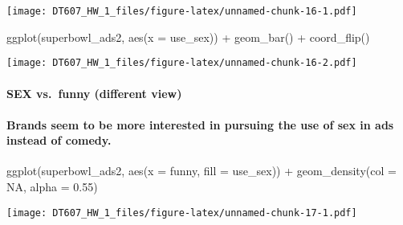 \documentclass[
]{article}
\newenvironment{Shaded}{\begin{snugshade}}{\end{snugshade}}
\newcommand{\AttributeTok}[1]{\textcolor[rgb]{0.77,0.63,0.00}{#1}}
\newcommand{\ConstantTok}[1]{\textcolor[rgb]{0.00,0.00,0.00}{#1}}
\newcommand{\FloatTok}[1]{\textcolor[rgb]{0.00,0.00,0.81}{#1}}
\newcommand{\FunctionTok}[1]{\textcolor[rgb]{0.00,0.00,0.00}{#1}}
\newcommand{\NormalTok}[1]{#1}
\newcommand{\SpecialCharTok}[1]{\textcolor[rgb]{0.00,0.00,0.00}{#1}}
\begin{document}
\texttt{[image: DT607\_HW\_1\_files/figure-latex/unnamed-chunk-16-1.pdf]}

\begin{Shaded}
\begin{Highlighting}[]
\FunctionTok{ggplot}\NormalTok{(superbowl\_ads2, }\FunctionTok{aes}\NormalTok{(}\AttributeTok{x =}\NormalTok{ use\_sex)) }\SpecialCharTok{+} 
  \FunctionTok{geom\_bar}\NormalTok{() }\SpecialCharTok{+}
  \FunctionTok{coord\_flip}\NormalTok{()}
\end{Highlighting}
\end{Shaded}

\texttt{[image: DT607\_HW\_1\_files/figure-latex/unnamed-chunk-16-2.pdf]}

\hypertarget{sex-vs.-funny-different-view}{%
\paragraph{SEX vs.~funny (different
view)}\label{sex-vs.-funny-different-view}}

\hypertarget{brands-seem-to-be-more-interested-in-pursuing-the-use-of-sex-in-ads-instead-of-comedy.}{%
\paragraph{Brands seem to be more interested in pursuing the use of sex
in ads instead of
comedy.}\label{brands-seem-to-be-more-interested-in-pursuing-the-use-of-sex-in-ads-instead-of-comedy.}}

\begin{Shaded}
\begin{Highlighting}[]
\FunctionTok{ggplot}\NormalTok{(superbowl\_ads2, }\FunctionTok{aes}\NormalTok{(}\AttributeTok{x =}\NormalTok{ funny, }\AttributeTok{fill =}\NormalTok{ use\_sex)) }\SpecialCharTok{+} 
  \FunctionTok{geom\_density}\NormalTok{(}\AttributeTok{col =} \ConstantTok{NA}\NormalTok{, }\AttributeTok{alpha =} \FloatTok{0.55}\NormalTok{)}
\end{Highlighting}
\end{Shaded}

\texttt{[image: DT607\_HW\_1\_files/figure-latex/unnamed-chunk-17-1.pdf]}
\end{document}
